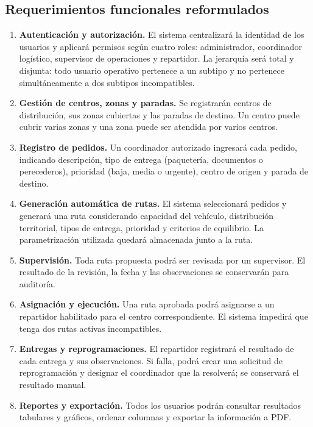 \documentclass[12pt,a4paper]{article}
\begin{document}
\subsection{Requerimientos funcionales reformulados}
\begin{enumerate}
\item \textbf{Autenticación y autorización.} El sistema centralizará la identidad de los usuarios y aplicará permisos según cuatro roles: administrador, coordinador logístico, supervisor de operaciones y repartidor. La jerarquía será total y disjunta: todo usuario operativo pertenece a un subtipo y no pertenece simultáneamente a dos subtipos incompatibles.
\item \textbf{Gestión de centros, zonas y paradas.} Se registrarán centros de distribución, sus zonas cubiertas y las paradas de destino. Un centro puede cubrir varias zonas y una zona puede ser atendida por varios centros.
\item \textbf{Registro de pedidos.} Un coordinador autorizado ingresará cada pedido, indicando descripción, tipo de entrega (paquetería, documentos o perecederos), prioridad (baja, media o urgente), centro de origen y parada de destino.
\item \textbf{Generación automática de rutas.} El sistema seleccionará pedidos y generará una ruta considerando capacidad del vehículo, distribución territorial, tipos de entrega, prioridad y criterios de equilibrio. La parametrización utilizada quedará almacenada junto a la ruta.
\item \textbf{Supervisión.} Toda ruta propuesta podrá ser revisada por un supervisor. El resultado de la revisión, la fecha y las observaciones se conservarán para auditoría.
\item \textbf{Asignación y ejecución.} Una ruta aprobada podrá asignarse a un repartidor habilitado para el centro correspondiente. El sistema impedirá que tenga dos rutas activas incompatibles.
\item \textbf{Entregas y reprogramaciones.} El repartidor registrará el resultado de cada entrega y sus observaciones. Si falla, podrá crear una solicitud de reprogramación y designar el coordinador que la resolverá; se conservará el resultado manual.
\item \textbf{Reportes y exportación.} Todos los usuarios podrán consultar resultados tabulares y gráficos, ordenar columnas y exportar la información a PDF.
\end{enumerate}
\end{document}
